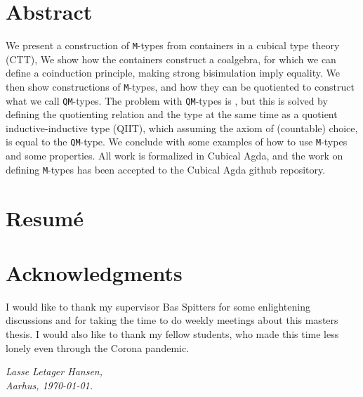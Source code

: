 \documentclass[twoside,11pt,openright]{report}
\theoremstyle{plain} %
\theoremstyle{definition}
\theoremstyle{remark}
\begin{document}

\pagestyle{empty} 
\vspace*{\fill}
\clearpage


\pagestyle{plain}
\chapter*{Abstract}

We present a construction of \texttt{M}-types from containers in a cubical type theory (CTT), We show how the containers construct a coalgebra, for which we can define a coinduction principle, making strong bisimulation imply equality. We then show constructions of \texttt{M}-types, and how they can be quotiented to construct what we call \texttt{QM}-types. The problem with \texttt{QM}-types is , but this is solved by defining the quotienting relation and the type at the same time as a quotient inductive-inductive type (QIIT), which assuming the axiom of (countable) choice, is equal to the \texttt{QM}-type. We conclude with some examples of how to use \texttt{M}-types and some properties. All work is formalized in Cubical Agda, and the work on defining \texttt{M}-types has been accepted to the Cubical Agda github repository.

\chapter*{Resum\'e}


\chapter*{Acknowledgments}
I would like to thank my supervisor Bas Spitters for some enlightening discussions and for taking the time to do weekly meetings about this masters thesis. I would also like to thank my fellow students, who made this time less lonely even through the Corona pandemic.
\vspace{2ex}
\begin{flushright}
  \emph{Lasse Letager Hansen,}\\
  \emph{Aarhus, \today.}
\end{flushright}
\end{document}
